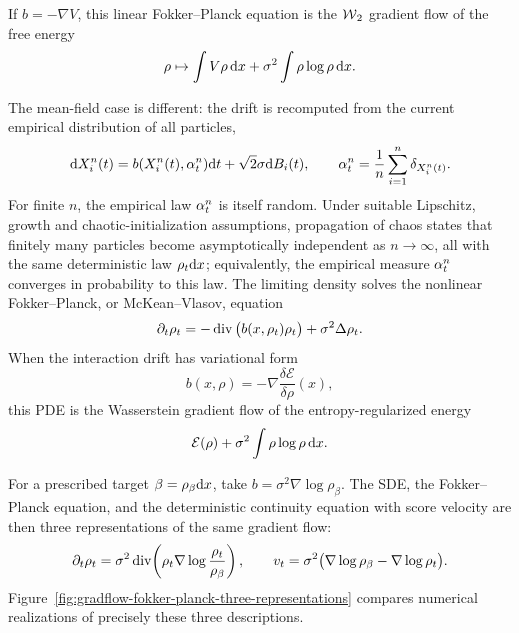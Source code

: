 \begin{example}
	If $b=-\nabla V$, this linear Fokker--Planck equation is the $\operatorname{\mathcal{W}}_2$ gradient flow of the free energy
	\[
		\rho\mapsto \int V\rho\,\mathrm{d} x+\sigma^2\int\rho\log\rho\,\mathrm{d} x.
	\]
\end{example}

The mean-field case is different: the drift is recomputed from the current empirical distribution of all particles,
\[
	\mathrm{d} X_i^n(t)=b(X_i^n(t),\alpha_t^n)\mathrm{d} t+\sqrt{2}\sigma\mathrm{d} B_i(t),
	\qquad
	\alpha_t^n=\frac1n\sum_{i=1}^n\delta_{X_i^n(t)}.
\]
For finite $n$, the empirical law $\alpha_t^n$ is itself random. Under suitable Lipschitz, growth and chaotic-initialization assumptions, propagation of chaos states that finitely many particles become asymptotically independent as $n\to\infty$, all with the same deterministic law $\rho_t\mathrm{d} x$; equivalently, the empirical measure $\alpha_t^n$ converges in probability to this law. The limiting density solves the nonlinear Fokker--Planck, or McKean--Vlasov, equation
\[
	\partial_t \rho_t
	=
	-\operatorname{div}\big(b(x,\rho_t)\rho_t\big)
	+
	\sigma^2\Delta\rho_t.
\]
When the interaction drift has variational form
\[
	b(x,\rho)=-\nabla \frac{\delta \mathcal E}{\delta \rho}(x),
\]
	this PDE is the Wasserstein gradient flow of the entropy-regularized energy
	\[
		\mathcal E(\rho)+\sigma^2\int \rho\log\rho\,\mathrm{d} x.
	\]

For a prescribed target $\beta=\rho_\beta\mathrm{d} x$, take $b=\sigma^2\nabla\log\rho_\beta$. The SDE, the Fokker--Planck equation, and the deterministic continuity equation with score velocity are then three representations of the same gradient flow:
\begin{equation}\label{eq-relative-entropy-three-representations}
	\partial_t\rho_t
	=
	\sigma^2\operatorname{div}\!\left(\rho_t\nabla\log\frac{\rho_t}{\rho_\beta}\right),
	\qquad
	v_t
	=
	\sigma^2\bigl(\nabla\log\rho_\beta-\nabla\log\rho_t\bigr).
\end{equation}
Figure~\ref{fig:gradflow-fokker-planck-three-representations} compares numerical realizations of precisely these three descriptions.

